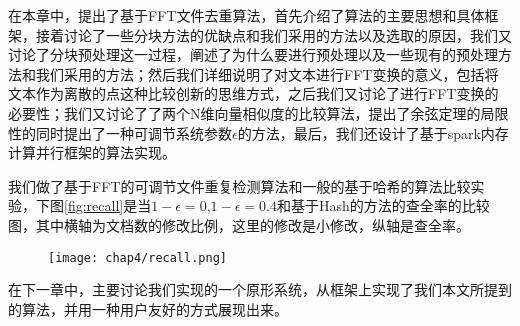 在本章中，提出了基于FFT文件去重算法，首先介绍了算法的主要思想和具体框架，接着讨论了一些分块方法的优缺点和我们采用的方法以及选取的原因，我们又讨论了分块预处理这一过程，阐述了为什么要进行预处理以及一些现有的预处理方法和我们采用的方法；然后我们详细说明了对文本进行FFT变换的意义，包括将文本作为离散的点这种比较创新的思维方式，之后我们又讨论了进行FFT变换的必要性；我们又讨论了了两个N维向量相似度的比较算法，提出了余弦定理的局限性的同时提出了一种可调节系统参数$\epsilon$的方法，最后，我们还设计了基于spark内存计算并行框架的算法实现。

我们做了基于FFT的可调节文件重复检测算法和一般的基于哈希的算法比较实验，下图\ref{fig:recall}是当$1-\epsilon=0$,$1-\epsilon=0.4$和基于Hash的方法的查全率的比较图，其中横轴为文档数的修改比例，这里的修改是小修改，纵轴是查全率。

\begin{figure}[!h]
    \begin{minipage}[b]{1\textwidth}
    \captionstyle{\centering}
    \centering
    \texttt{[image: chap4/recall.png]}
    \end{minipage}     
\end{figure}


在下一章中，主要讨论我们实现的一个原形系统，从框架上实现了我们本文所提到的算法，并用一种用户友好的方式展现出来。
